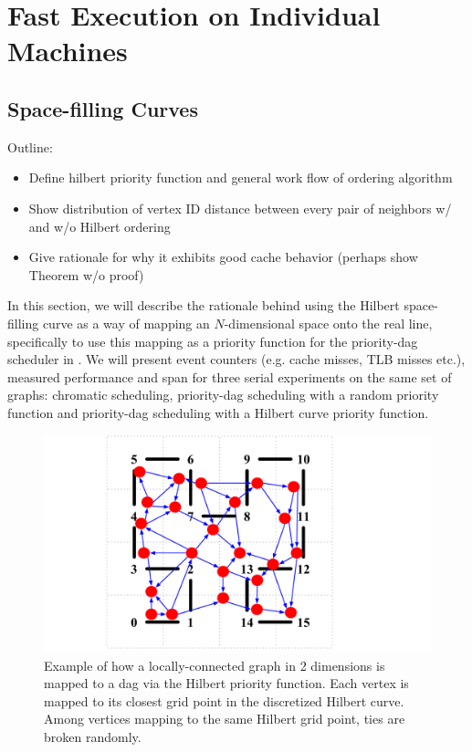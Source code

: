 \section{Fast Execution on Individual Machines}
\label{sec:multicore}


\subsection{Space-filling Curves}

Outline:
\begin{itemize}
\item Define hilbert priority function and general work flow of ordering algorithm
\item Show distribution of vertex ID distance between every pair of neighbors w/ and w/o Hilbert ordering
\item Give rationale for why it exhibits good cache behavior (perhaps show Theorem w/o proof)
\end{itemize}




In this section, we will describe the rationale behind using the
Hilbert space-filling curve as a way of mapping an $N$-dimensional
space onto the real line, specifically to use this mapping as a
priority function for the priority-dag scheduler in .
We will present event counters (e.g. cache misses, TLB misses etc.), 
measured performance and span for three serial experiments on the same
set of graphs: chromatic scheduling, priority-dag scheduling with
a random priority function and priority-dag scheduling with a
Hilbert curve priority function.  

\begin{figure}[h]
\centering
\includegraphics[width=5in]{figures/hilbert_priority_function.pdf}
\caption{Example of how a locally-connected graph in 2 dimensions
is mapped to a dag via the Hilbert priority function.  Each
vertex is mapped to its closest grid point in the discretized
Hilbert curve.  Among vertices mapping to the same Hilbert grid
point, ties are broken randomly.}
\label{fig:hilbert_priority}
\end{figure}


